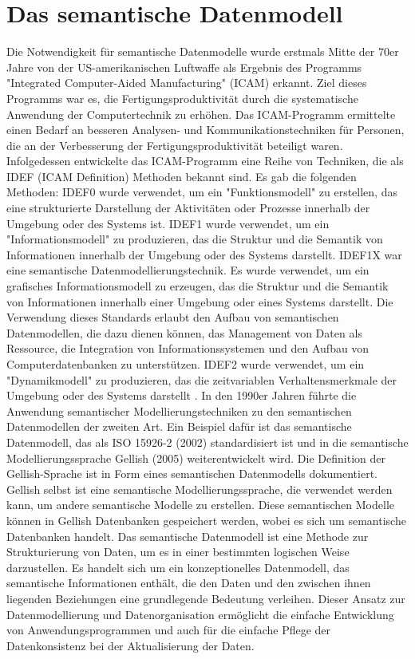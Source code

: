 \section{Das semantische Datenmodell}

Die Notwendigkeit für semantische Datenmodelle wurde erstmals Mitte der 70er Jahre von der US-amerikanischen Luftwaffe als Ergebnis des Programms "Integrated Computer-Aided Manufacturing" (ICAM) erkannt. Ziel dieses Programms war es, die Fertigungsproduktivität durch die systematische Anwendung der Computertechnik zu erhöhen. Das ICAM-Programm ermittelte einen Bedarf an besseren Analysen- und Kommunikationstechniken für Personen, die an der Verbesserung der Fertigungsproduktivität beteiligt waren. Infolgedessen entwickelte das ICAM-Programm eine Reihe von Techniken, die als IDEF (ICAM Definition) Methoden bekannt sind. \cite{bekke2005} Es gab die folgenden Methoden:
IDEF0 wurde verwendet, um ein "Funktionsmodell" zu erstellen, das eine strukturierte Darstellung der Aktivitäten oder Prozesse innerhalb der Umgebung oder des Systems ist.
IDEF1 wurde verwendet, um ein "Informationsmodell" zu produzieren, das die Struktur und die Semantik von Informationen innerhalb der Umgebung oder des Systems darstellt.
IDEF1X war eine semantische Datenmodellierungstechnik. Es wurde verwendet, um ein grafisches Informationsmodell zu erzeugen, das die Struktur und die Semantik von Informationen innerhalb einer Umgebung oder eines Systems darstellt. Die Verwendung dieses Standards erlaubt den Aufbau von semantischen Datenmodellen, die dazu dienen können, das Management von Daten als Ressource, die Integration von Informationssystemen und den Aufbau von Computerdatenbanken zu unterstützen.
IDEF2 wurde verwendet, um ein "Dynamikmodell" zu produzieren, das die zeitvariablen Verhaltensmerkmale der Umgebung oder des Systems darstellt \cite{rishe1992}.
In den 1990er Jahren führte die Anwendung semantischer Modellierungstechniken zu den semantischen Datenmodellen der zweiten Art. Ein Beispiel dafür ist das semantische Datenmodell, das als ISO 15926-2 (2002) standardisiert ist und in die semantische Modellierungssprache Gellish (2005) weiterentwickelt wird. Die Definition der Gellish-Sprache ist in Form eines semantischen Datenmodells dokumentiert. Gellish selbst ist eine semantische Modellierungssprache, die verwendet werden kann, um andere semantische Modelle zu erstellen. Diese semantischen Modelle können in Gellish Datenbanken gespeichert werden, wobei es sich um semantische Datenbanken handelt. \cite{gray2004}
Das semantische Datenmodell ist eine Methode zur Strukturierung von Daten, um es in einer bestimmten logischen Weise darzustellen. Es handelt sich um ein konzeptionelles Datenmodell, das semantische Informationen enthält, die den Daten und den zwischen ihnen liegenden Beziehungen eine grundlegende Bedeutung verleihen. Dieser Ansatz zur Datenmodellierung und Datenorganisation ermöglicht die einfache Entwicklung von Anwendungsprogrammen und auch für die einfache Pflege der Datenkonsistenz bei der Aktualisierung der Daten.
